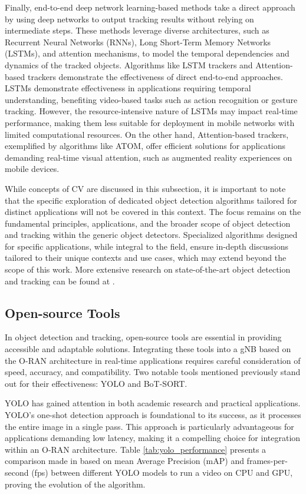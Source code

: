 Finally, end-to-end deep network learning-based methods take a direct approach by using deep networks to output tracking results without relying on intermediate steps. These methods leverage diverse architectures, such as Recurrent Neural Networks (RNNs), Long Short-Term Memory Networks (LSTMs), and attention mechanisms, to model the temporal dependencies and dynamics of the tracked objects. Algorithms like LSTM trackers and Attention-based trackers demonstrate the effectiveness of direct end-to-end approaches. LSTMs demonstrate effectiveness in applications requiring temporal understanding, benefiting video-based tasks such as action recognition or gesture tracking. However, the resource-intensive nature of LSTMs may impact real-time performance, making them less suitable for deployment in mobile networks with limited computational resources. On the other hand, Attention-based trackers, exemplified by algorithms like ATOM, offer efficient solutions for applications demanding real-time visual attention, such as augmented reality experiences on mobile devices. 

While concepts of CV are discussed in this subsection, it is important to note that the specific exploration of dedicated object detection algorithms tailored for distinct applications will not be covered in this context. The focus remains on the fundamental principles, applications, and the broader scope of object detection and tracking within the generic object detectors. Specialized algorithms designed for specific applications, while integral to the field, ensure in-depth discussions tailored to their unique contexts and use cases, which may extend beyond the scope of this work. More extensive research on state-of-the-art object detection and tracking can be found at \cite{obj_detec_SOA}.

\subsection{Open-source Tools}\label{sec:open_tools}
In object detection and tracking, open-source tools are essential in providing accessible and adaptable solutions. Integrating these tools into a gNB based on the O-RAN architecture in real-time applications requires careful consideration of speed, accuracy, and compatibility. Two notable tools mentioned previously stand out for their effectiveness: YOLO and BoT-SORT.

YOLO has gained attention in both academic research and practical applications. YOLO's one-shot detection approach is foundational to its success, as it processes the entire image in a single pass. This approach is particularly advantageous for applications demanding low latency, making it a compelling choice for integration within an O-RAN architecture. Table \ref{tab:yolo_performance} presents a comparison made in \cite{YOLO_compare} based on mean Average Precision (mAP) and frames-per-second (fps) between different YOLO models to run a video on CPU and GPU, proving the evolution of the algorithm. 

